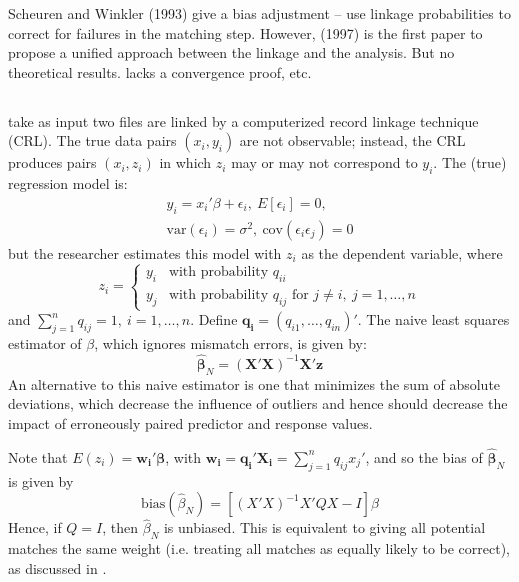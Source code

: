 \documentclass[12pt]{article}
\begin{document}
Scheuren and Winkler (1993) give a bias adjustment -- use linkage probabilities to correct for failures in the matching step.  However, \cite{sw1997} (1997) is the first paper to propose a unified approach between the linkage and the analysis.  But no theoretical results. lacks a convergence proof, etc. 

\subsection{\cite{lahiri05}}
\cite{lahiri05} take as input two files are linked by a computerized record linkage technique (CRL).  The true data pairs $(x_i, y_i)$ are not observable; instead, the CRL produces pairs $(x_i, z_i)$ in which $z_i$ may or may not correspond to $y_i$.  The (true) regression model is:
\begin{gather*}y_i = x_i'\beta + \epsilon_i,\ E[\epsilon_i] = 0,\\ \text{var}(\epsilon_i) = \sigma^2,\ \text{cov}(\epsilon_i \epsilon_j) = 0 \end{gather*}
but the researcher estimates this model with $z_i$ as the dependent variable, where $$z_i = \begin{cases} y_i & \text{with probability $q_{ii}$} \\ y_j & \text{with probability $q_{ij}$ for $j\neq i,\ j = 1,\dots,n $} \end{cases}$$ 
and $\sum_{j=1}^n q_{ij} = 1, \ i=1,\dots, n$.  Define $\mathbf{q_i} = (q_{i1}, \dots, q_{in})'$.  The naive least squares estimator of $\beta$, which ignores mismatch errors, is given by:
$$\hat{\mathbf{\beta}}_N = (\mathbf{X'X})^{-1} \mathbf{X'z} $$ 
An alternative to this naive estimator is one that minimizes the sum of absolute deviations, which decrease the influence of outliers and hence should decrease the impact of erroneously paired predictor and response values.  

Note that $E(z_i) = \mathbf{w_i'\beta}$, with $\mathbf{w_i = q_i'X_i} = \sum_{j=1}^n q_{ij} x_j' $, and so the bias of $\hat{\mathbf{\beta}}_N $ is given by
$$\text{bias}(\hat{\beta}_N) = [(X'X)^{-1} X'QX - I] \beta $$ 
Hence, if $Q = I$, then $\hat{\beta}_N$ is unbiased.  This is equivalent to giving all potential matches the same weight (i.e. treating all matches as equally likely to be correct), as discussed in \cite{ahl2019}.  
\end{document}
